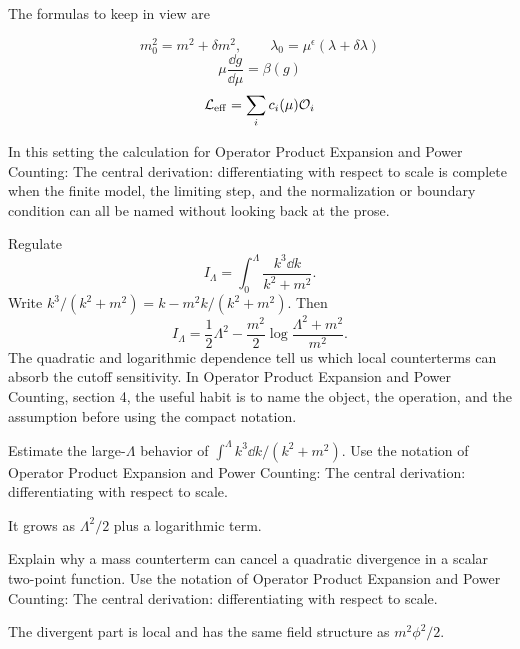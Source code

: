 The formulas to keep in view are

\[
  m_0^2=m^2+\delta m^2,\qquad \lambda_0=\mu^\epsilon(\lambda+\delta\lambda)
\]
\[
  \mu\frac{\dd g}{\dd\mu}=\beta(g)
\]
\[
  \mathcal L_{\mathrm{eff}}=\sum_i c_i(\mu)\mathcal O_i
\]

In this setting the calculation for Operator Product Expansion and Power Counting: The central derivation: differentiating with respect to scale is complete when the finite model, the limiting step, and the normalization or boundary condition can all be named without looking back at the prose.




\begin{example}
Regulate
\[
  I_\Lambda=\int_0^\Lambda\frac{k^3\dd k}{k^2+m^2}.
\]
Write \(k^3/(k^2+m^2)=k-m^2k/(k^2+m^2)\).  Then
\[
  I_\Lambda=\frac12\Lambda^2-\frac{m^2}{2}\log\frac{\Lambda^2+m^2}{m^2}.
\]
The quadratic and logarithmic dependence tell us which local counterterms can absorb the cutoff sensitivity.  In Operator Product Expansion and Power Counting, section 4, the useful habit is to name the object, the operation, and the assumption before using the compact notation.
\end{example}



\begin{exercise}
Estimate the large-\(\Lambda\) behavior of \(\int^\Lambda k^3\dd k/(k^2+m^2)\).  Use the notation of Operator Product Expansion and Power Counting: The central derivation: differentiating with respect to scale.
\begin{answer}
It grows as \(\Lambda^2/2\) plus a logarithmic term.
\end{answer}
\end{exercise}

\begin{exercise}
Explain why a mass counterterm can cancel a quadratic divergence in a scalar two-point function.  Use the notation of Operator Product Expansion and Power Counting: The central derivation: differentiating with respect to scale.
\begin{answer}
The divergent part is local and has the same field structure as \(m^2\phi^2/2\).
\end{answer}
\end{exercise}



